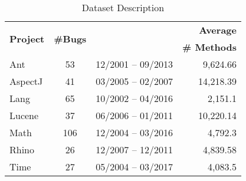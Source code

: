\begin{table}[t]
	\centering
	\caption{Dataset Description}
    \begin{tabular}{|l|c|c|r|}
    \hline
   \multirow{2}{*}{\textbf{Project}} &\multirow{2}{*}{\textbf{\#Bugs}}&{\multirow{2}{*}{\textbf{Time Period}}}& \textbf{Average}   \\
    ~       &             &                                   &\textbf{\# Methods}   \\ \hline
	\hline
	Ant       & 53                                          & 12/2001 -- 09/2013 & 9,624.66   \\ 
    AspectJ       & 41                                              & 03/2005 -- 02/2007                                   & 14,218.39   \\ 
     
Lang       &     65                                          & 	10/2002 -- 	04/2016 & 2,151.1  \\
    Lucene       & 37                                              & 06/2006 -- 01/2011                   & 10,220.14   \\
    Math       & 106                                              &  12/2004 --  03/2016& 4,792.3   \\ 
    Rhino       & 26                                                 &  12/2007 -- 12/2011                                   & 4,839.58   \\
    Time       & 27                                                 &                      05/2004 -- 03/2017            & 4,083.5
    \\ \hline
    \end{tabular}
    \label{tab:dataset}
\end{table}


